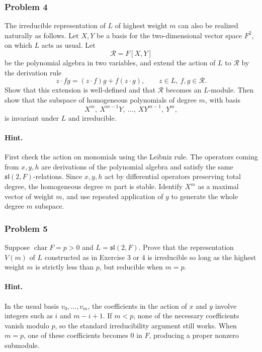 \documentclass[12pt, a4paper]{article}
\begin{document}
\subsubsection{Problem 4}

The irreducible representation of \(L\) of highest weight \(m\) can also be
realized naturally as follows. Let \(X,Y\) be a basis for the two-dimensional
vector space \(F^2\), on which \(L\) acts as usual. Let
\[
\mathcal{R}=F[X,Y]
\]
be the polynomial algebra in two variables, and extend the action of \(L\) to
\(\mathcal{R}\) by the derivation rule
\[
z\cdot fg=(z\cdot f)g+f(z\cdot g),
\qquad z\in L,\ f,g\in\mathcal{R}.
\]
Show that this extension is well-defined and that \(\mathcal{R}\) becomes an
\(L\)-module. Then show that the subspace of homogeneous polynomials of degree
\(m\), with basis
\[
X^m,\ X^{m-1}Y,\ \ldots,\ XY^{m-1},\ Y^m,
\]
is invariant under \(L\) and irreducible.

\paragraph{Hint.}
First check the action on monomials using the Leibniz rule. The operators
coming from \(x,y,h\) are derivations of the polynomial algebra and satisfy
the same \(\mathfrak{sl}(2,F)\)-relations. Since \(x,y,h\) act by differential
operators preserving total degree, the homogeneous degree \(m\) part is
stable. Identify \(X^m\) as a maximal vector of weight \(m\), and use repeated
application of \(y\) to generate the whole degree \(m\) subspace.

\subsubsection{Problem 5}

Suppose \(\operatorname{char}F=p>0\) and \(L=\mathfrak{sl}(2,F)\). Prove that
the representation \(V(m)\) of \(L\) constructed as in Exercise 3 or 4 is
irreducible so long as the highest weight \(m\) is strictly less than \(p\),
but reducible when \(m=p\).

\paragraph{Hint.}
In the usual basis \(v_0,\ldots,v_m\), the coefficients in the action of \(x\)
and \(y\) involve integers such as \(i\) and \(m-i+1\). If \(m<p\), none of the
necessary coefficients vanish modulo \(p\), so the standard irreducibility
argument still works. When \(m=p\), one of these coefficients becomes \(0\) in
\(F\), producing a proper nonzero submodule.
\end{document}
